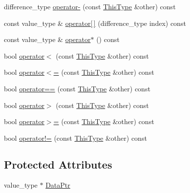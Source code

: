\begin{DoxyCompactItemize}
\item 
difference\-\_\-type \hyperlink{classvct_fixed_stride_vector_const_iterator_a634eeb39656c15f1d91ee9caa8ca1ae7}{operator-\/} (const \hyperlink{classvct_fixed_stride_vector_const_iterator_ac60fc9d8c2af56a7f251d9a7040efa1e}{This\-Type} \&other) const 
\item 
const value\-\_\-type \& \hyperlink{classvct_fixed_stride_vector_const_iterator_a62efb78d7e84211ce59812998867f031}{operator\mbox{[}$\,$\mbox{]}} (difference\-\_\-type index) const 
\item 
const value\-\_\-type \& \hyperlink{classvct_fixed_stride_vector_const_iterator_a4e5be3b2f09d01b41fb383780db098c9}{operator$\ast$} () const 
\item 
bool \hyperlink{classvct_fixed_stride_vector_const_iterator_a8d2b30eb9dad78bd171454414c43ad74}{operator$<$} (const \hyperlink{classvct_fixed_stride_vector_const_iterator_ac60fc9d8c2af56a7f251d9a7040efa1e}{This\-Type} \&other) const 
\item 
bool \hyperlink{classvct_fixed_stride_vector_const_iterator_a597bd121dba5d1b3c43427100874b10d}{operator$<$=} (const \hyperlink{classvct_fixed_stride_vector_const_iterator_ac60fc9d8c2af56a7f251d9a7040efa1e}{This\-Type} \&other) const 
\item 
bool \hyperlink{classvct_fixed_stride_vector_const_iterator_a3dc617f3270778802522a9a6245e21fc}{operator==} (const \hyperlink{classvct_fixed_stride_vector_const_iterator_ac60fc9d8c2af56a7f251d9a7040efa1e}{This\-Type} \&other) const 
\item 
bool \hyperlink{classvct_fixed_stride_vector_const_iterator_a15f8e0e81cf5056d5f54057f1de90208}{operator$>$} (const \hyperlink{classvct_fixed_stride_vector_const_iterator_ac60fc9d8c2af56a7f251d9a7040efa1e}{This\-Type} \&other) const 
\item 
bool \hyperlink{classvct_fixed_stride_vector_const_iterator_a08e1db0e0498d3c1caa16cebf634bdde}{operator$>$=} (const \hyperlink{classvct_fixed_stride_vector_const_iterator_ac60fc9d8c2af56a7f251d9a7040efa1e}{This\-Type} \&other) const 
\item 
bool \hyperlink{classvct_fixed_stride_vector_const_iterator_a0f5547fa56ea4b5bc09334f6aac85b6b}{operator!=} (const \hyperlink{classvct_fixed_stride_vector_const_iterator_ac60fc9d8c2af56a7f251d9a7040efa1e}{This\-Type} \&other) const 
\end{DoxyCompactItemize}
\subsection*{Protected Attributes}
\begin{DoxyCompactItemize}
\item 
value\-\_\-type $\ast$ \hyperlink{classvct_fixed_stride_vector_const_iterator_a892f486c46b720c90ed18bb9bdb1793e}{Data\-Ptr}
\end{DoxyCompactItemize}


